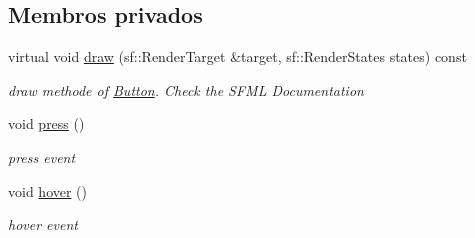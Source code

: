\subsection*{Membros privados}
\begin{DoxyCompactItemize}
\item 
virtual void \hyperlink{classButton_a13280eb9f2786fd2597fd3b9c9c5c858}{draw} (sf\+::\+Render\+Target \&target, sf\+::\+Render\+States states) const
\begin{DoxyCompactList}\small\item\em draw methode of \hyperlink{classButton}{Button}. Check the S\+F\+ML Documentation \end{DoxyCompactList}\item 
void \hyperlink{classButton_af1464b95c6e43e125904b46670272ed2}{press} ()
\begin{DoxyCompactList}\small\item\em press event \end{DoxyCompactList}\item 
void \hyperlink{classButton_a1a5ca19ed8efe0ea27625217dcab9f2c}{hover} ()
\begin{DoxyCompactList}\small\item\em hover event \end{DoxyCompactList}\end{DoxyCompactItemize}
